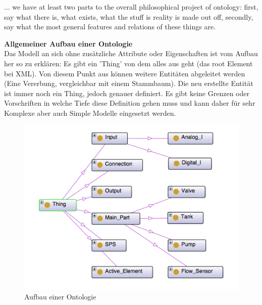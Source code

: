 \begin{displayquote}... we have at least two parts to the overall philosophical project of ontology: first, say what there is, what exists, what the stuff is reality is made out off, secondly, say what the most general features and relations of these things are.
\end{displayquote}
\textbf{Allgemeiner Aufbau einer Ontologie}\\
Das Modell an sich ohne zusätzliche Attribute oder Eigenschaften ist vom Aufbau her so zu erklären: Es gibt ein 'Thing' von dem alles aus geht (das root Element bei XML). Von diesem Punkt aus können weitere Entitäten abgeleitet werden (Eine Vererbung, vergleichbar mit einem Stammbaum). Die neu erstellte Entität ist immer noch ein Thing, jedoch genauer definiert. Es gibt keine Grenzen oder Vorschriften in welche Tiefe diese Definition gehen muss und kann daher für sehr Komplexe aber auch Simple Modelle eingesetzt werden.\\

\begin{figure}[hbt!]
 \centering
  \includegraphics[width=1\textwidth]{graphics/stateoftheart/Ontology_Aufbau}
  \caption{Aufbau einer Ontologie}
	\label{fig:Ontology_Aufbau}
\end{figure}

